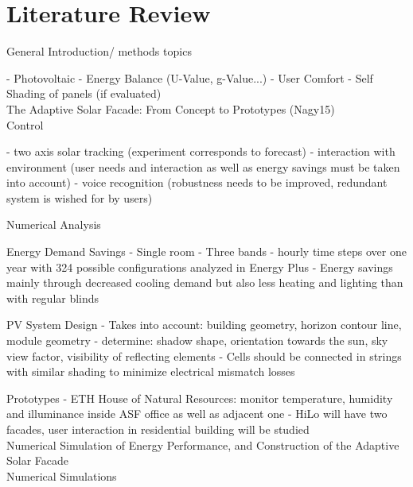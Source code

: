 
\chapter{Literature Review}


General Introduction/ methods topics 

	- Photovoltaic
	- Energy Balance (U-Value, g-Value...)
	- User Comfort
	- Self Shading of panels (if evaluated)\\




The Adaptive Solar Facade: From Concept to Prototypes (Nagy15)\\


	Control
	
	- two axis solar tracking (experiment corresponds to forecast)
	- interaction with environment (user needs and interaction as well as energy savings must be taken into account)
	- voice recognition (robustness needs to be improved, redundant system is wished for by users)
	
	
	Numerical Analysis
	
	Energy Demand Savings
	- Single room
	- Three bands
	- hourly time steps over one year with 324 possible configurations analyzed in Energy Plus
	- Energy savings mainly through decreased cooling demand but also less heating and lighting than with regular blinds
	
	PV System Design
	- Takes into account: building geometry, horizon contour line, module geometry
	- determine: shadow shape, orientation towards the sun, sky view factor, visibility of reflecting elements
	- Cells should be connected in strings with similar shading to minimize electrical mismatch losses
	
	
	Prototypes
	- ETH House of Natural Resources: monitor temperature, humidity and illuminance inside ASF office as well as adjacent one
	- HiLo will have two facades, user interaction in residential building will be studied\\
	
	
	
Numerical Simulation of Energy Performance, and Construction of the Adaptive Solar Facade\\

	
	Numerical Simulations
	
